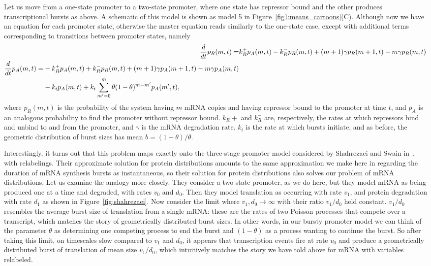 Let us move from a one-state promoter to a two-state promoter, where one state
has repressor bound and the other produces transcriptional bursts as above.
A schematic of this model is shown as model 5 in
Figure~\ref{fig1:means_cartoons}(C). Although now we have an equation for each
promoter state, otherwise the master equation reads similarly to the one-state
case, except with additional terms corresponding to transitions between promoter
states, namely
\begin{align}
{d\over dt}p_R(m,t) =& 
k_R^+ p_A(m,t) - k_R^- p_R(m,t)
        + (m+1)\gamma p_R(m+1,t) - m\gamma p_R(m,t)
\\
\begin{split}
{d\over dt}p_A(m,t) =& - k_R^+ p_A(m,t) + k_R^- p_R(m,t)
        + (m+1)\gamma p_A(m+1,t) - m\gamma p_A(m,t) 
\\
&- k_i p_A(m,t) + k_i \sum_{m^\prime=0}^m \theta(1-\theta)^{m-m^\prime} p_A(m^\prime,t),
\end{split}
\end{align}
where $p_R(m,t)$ is the probability of the system having $m$ mRNA copies and
having repressor bound to the promoter at time $t$, and $p_A$ is an analogous
probability to find the promoter without repressor bound. $k_R+$ and $k_R^-$
are, respectively, the rates at which repressors bind and unbind to and from the
promoter, and $\gamma$ is the mRNA degradation rate. $k_i$ is the rate at which
bursts initiate, and as before, the geometric distribution of burst sizes has
mean $b=(1-\theta)/\theta$.

Interestingly, it turns out that this problem maps exactly onto the three-stage
promoter model considered by Shahrezaei and Swain in~\cite{Shahrezaei2008}, with
relabelings. Their approximate solution for protein distributions amounts to the
same approximation we make here in regarding the duration of mRNA synthesis
bursts as instantaneous, so their solution for protein distributions also solves
our problem of mRNA distributions. Let us examine the analogy more closely. They
consider a two-state promoter, as we do here, but they model mRNA as being
produced one at a time and degraded, with rates $v_0$ and $d_0$. Then they model
translation as occurring with rate $v_1$, and protein degradation with rate
$d_1$ as shown in Figure~\ref{fig:shahrezaei}. Now consider the limit where
$v_1, d_0\rightarrow\infty$ with their ratio $v_1/d_0$ held constant. $v_1/d_0$
resembles the average burst size of translation from a single mRNA: these are
the rates of two Poisson processes that compete over a transcript, which matches
the story of geometrically distributed burst sizes. In other words, in our 
bursty promoter model we can think of the parameter $\theta$ as determining one
competing process to end the burst and $(1 - \theta)$ as a process wanting to
continue the burst. So after taking this limit, on timescales slow compared to
$v_1$ and $d_0$, it appears that transcription events fire at rate $v_0$ and
produce a geometrically distributed burst of translation of mean size $v_1/d_0$,
which intuitively matches the story we have told above for mRNA with variables
relabeled.

